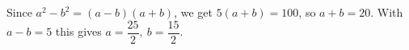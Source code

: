 Since $a^2-b^2=(a-b)(a+b)$, we get $5(a+b)=100$, so $a+b=20$. With $a-b=5$ this gives $\boxed{a=\dfrac{25}{2},\ b=\dfrac{15}{2}}$.
